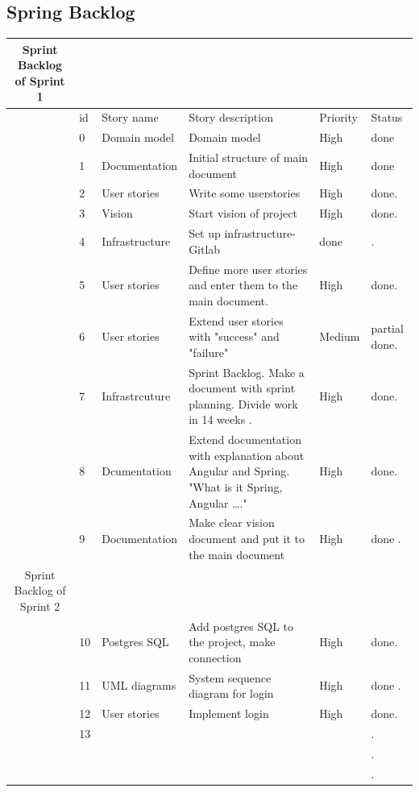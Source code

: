 \documentclass{scrartcl}
\begin{document}
\subsection{Spring Backlog}
\begin{table}[H]
    \centering
    \begin{tabular}{c@{\qquad}lllll}
   Sprint Backlog of Sprint 1\\
    
        \toprule
           & id & Story name & Story description & Priority & Status\\
        \midrule
        & 0 & Domain model & Domain model & High & done \\ \hline
        & 1 & Documentation  & Initial structure of main document & High & done \\ \hline
        
         &  2 &  User stories  & Write some userstories  & High & done. \\ \hline
          & 3 &  Vision &  Start vision of project & High  & done. \\ \hline
           & 4 & Infrastructure & Set up infrastructure- Gitlab & done & . \\ \hline
            & 5 &  User stories & Define more user stories and enter them to the main document. & High & done. \\ \hline
             & 6 & User stories & Extend user stories with "success" and "failure" & Medium & partial done. \\ \hline
              & 7 & Infrastrcuture & Sprint Backlog. Make a document with sprint planning. Divide work in 14 weeks .  & High &  done. \\ \hline
               & 8 & Dcumentation & Extend documentation with explanation about Angular and Spring. "What is it Spring, Angular …." & High & done. \\ \hline
               & 9 & Documentation & Make clear vision document and put it to the main document & High & done . \\ \hline
               
                Sprint Backlog of Sprint 2 \\
                 & 10 & Postgres SQL & Add postgres SQL to the project, make connection & High & done. \\ \hline
                  &  11& UML diagrams & System sequence diagram for login & High & done . \\ \hline
                   & 12 &  User stories &  Implement login & High & done. \\ \hline
                    & 13 &  &  &  & . \\ \hline
                     &  &  &  &  & . \\ \hline
                      &  &  &  &  & . \\ \hline
                    

\end{tabular}
\end{table}
\end{document}
